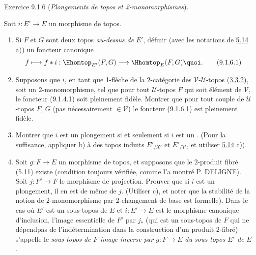 \documentclass[10pt]{../fichiers-configuration-latex/smfart}
\begin{document}
\begin{enonce*}[remark]{Exercice 9.1.6}
(\emph{Plongements de topos et 2-monomorphismes}).

Soit $i:E'\rightarrow E$ un morphisme de topos.

\begin{enumerate}
\renewcommand{\theenumi}{\alph{enumi}}
\renewcommand{\labelenumi}{\theenumi)}
\item Si $F$ et $G$ sont deux topos \emph{au-dessus de} $E'$, définir
(avec les notations de \hyperref[IV.exer5.14]{5.14} a)) un foncteur canonique
\begin{equation*}
f\longmapsto f\ast i:\Hhomtop_{E'}(F,G)\longrightarrow
\Hhomtop_E(F,G){\quoi}.\tag{9.1.6.1}
\end{equation*}

\item Supposons que $i$, en tant que 1-flèche de la 2-catégorie des
$𝒱\text{-}𝒰$-topos (\hyperref[IV.subsubsec3.3.2]{3.3.2}), soit
un $2$-monomorphisme, \ie tel que pour tout $𝒰$-topos $F$ qui
soit élément de $𝒱$, le foncteur (9.1.4.1) soit pleinement %
fidèle. Montrer que pour tout couple de $𝒰$-topos $F$, $G$
(pas nécessairement $\in 𝒱$) le foncteur (9.1.6.1) est %
pleinement fidèle.

\item Montrer que $i$ est un plongement si et seulement si $i$ est un
. (Pour la suffisance, appliquer b) à des topos
induits $E'_{/X'}$ et $E'_{/Y'}$, et utiliser \hyperref[IV.exer5.14]{5.14} c)).

\item Soit $g:F\rightarrow E$ un morphisme de topos, et supposons que
le $2$-produit fibré (\hyperref[IV.prop5.11]{5.11}) 
existe (condition toujours vérifiée, comme l'a montré P. DELIGNE).
Soit $j:F'\rightarrow F$ le morphisme de projection. Prouver que si
$i$ est un plongement, il en est de même de $j$. (Utiliser c), et
noter que la stabilité de la notion de 2-monomorphisme par
2-changement de base est formelle). Dans le cas où $E'$ est un
sous-topos de $E$ et $i:E'\rightarrow E$ est le morphisme canonique
d'inclusion, l'image essentielle de $F'$ par $j_{\ast}$ (qui est un
sous-topos de $F$ qui ne dépend\pageoriginale pas de
l'indétermination dans la construction d'un produit 2-fibré)
s'appelle le \emph{sous-topos de $F$ image inverse par
$g:F\rightarrow E$ du sous-topos $E'$ de $E$.}


\end{enumerate}
\end{enonce*}
\end{document}

